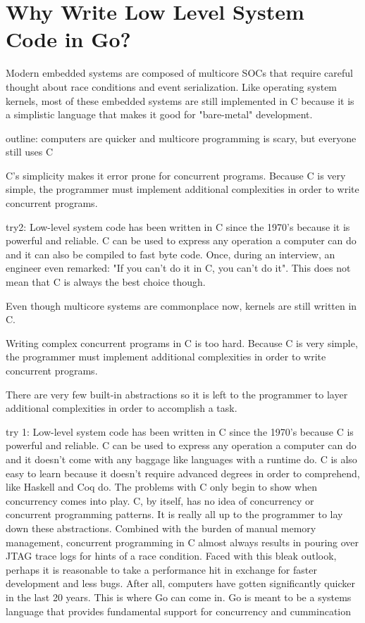 \chapter{Why Write Low Level System Code in Go?}

Modern embedded systems are composed of multicore SOCs that require
careful thought about race conditions and event serialization. Like
operating system kernels, most of these embedded systems are still implemented
in C because it is a simplistic language that makes it good for "bare-metal"
development.


outline:
computers are quicker and multicore programming is scary, but everyone still uses C

C's simplicity makes it error prone for concurrent programs.
Because C is very simple, the programmer must implement additional complexities in order to write
concurrent programs.

try2:
Low-level system code has been written in C since the 1970's because it is powerful
and reliable. C can be used to express any operation a computer can do and it can also be
compiled to fast byte code. Once, during an interview, an engineer even remarked: "If you
can't do it in C, you can't do it". This does not mean that C is always the best choice though.

Even though multicore systems are commonplace now, kernels are still written in C.

Writing complex concurrent programs in C is too hard. Because C is very simple,
the programmer must implement additional complexities in order to write
concurrent programs.


There are very
few built-in abstractions so it is left to the programmer to layer additional complexities
in order to accomplish a task.


try 1:
Low-level system code has been written in C since the 1970's because C is powerful
and reliable. C can be used to express any operation a computer can do and it doesn't come
with any baggage like languages with a runtime do. C is also easy to learn because it doesn't
require advanced degrees in order to comprehend, like Haskell and Coq do. The problems with C
only begin to show when concurrency comes into play. C, by itself, has no idea of concurrency
or concurrent programming patterns. It is really all up to the programmer to lay down these
abstractions. Combined with the burden of manual memory management, concurrent programming in C
almost always results in pouring over JTAG trace logs for hints of a race condition.
  Faced with this bleak outlook, perhaps it is reasonable to take a performance hit in exchange for
faster development and less bugs. After all, computers have gotten significantly quicker in
the last 20 years. This is where Go can come in. Go is meant to be a systems language
that provides fundamental support for concurrency and cummincation
